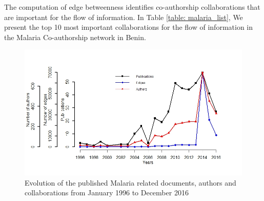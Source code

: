 The computation of edge betweenness identifies co-authorship collaborations that are important for the flow of information. In Table \ref{table: malaria_list}, We present the top 10 most important collaborations for the flow of information in the Malaria Co-authorship network in Benin.

\begin{figure}[!ht]
\centering
\includegraphics[scale=0.65]{Chapters/malaria/pubDist}
\caption{Evolution of the published Malaria related documents, authors and collaborations from January 1996 to December 2016}
\label{fig: malaria_pubDist}
\end{figure}

